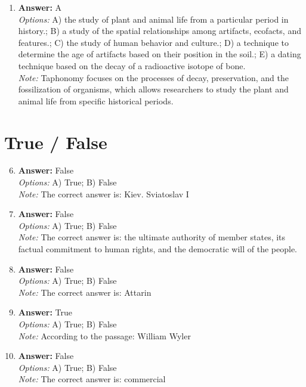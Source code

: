 \documentclass[12pt]{article}
\begin{document}
\begin{enumerate}[label=\arabic*.]
\\ \textit{Note:} The mismatch between the skulls of early migrants to the New World and those of modern Native Americans indicates that craniometric measurements may not accurately reflect genetic or population continuity over time, thus questioning the reliability of this method in tracing demographic changes.
\item \textbf{Answer:} A
\\ \textit{Options:} A) the study of plant and animal life from a particular period in history.; B) a study of the spatial relationships among artifacts, ecofacts, and features.; C) the study of human behavior and culture.; D) a technique to determine the age of artifacts based on their position in the soil.; E) a dating technique based on the decay of a radioactive isotope of bone.
\\ \textit{Note:} Taphonomy focuses on the processes of decay, preservation, and the fossilization of organisms, which allows researchers to study the plant and animal life from specific historical periods.
\end{enumerate}

\section*{True / False}
\begin{enumerate}[label=\arabic*.]
\setcounter{enumi}{5}
\item \textbf{Answer:} False
\\ \textit{Options:} A) True; B) False
\\ \textit{Note:} The correct answer is: Kiev. Sviatoslav I
\item \textbf{Answer:} False
\\ \textit{Options:} A) True; B) False
\\ \textit{Note:} The correct answer is: the ultimate authority of member states, its factual commitment to human rights, and the democratic will of the people.
\item \textbf{Answer:} False
\\ \textit{Options:} A) True; B) False
\\ \textit{Note:} The correct answer is: Attarin
\item \textbf{Answer:} True
\\ \textit{Options:} A) True; B) False
\\ \textit{Note:} According to the passage: William Wyler
\item \textbf{Answer:} False
\\ \textit{Options:} A) True; B) False
\\ \textit{Note:} The correct answer is: commercial
\end{enumerate}
\end{document}
